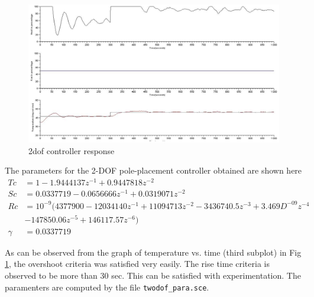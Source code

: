 \begin{figure}
\centering
\includegraphics[width=0.9\linewidth]{prbs/prbs-2dof-controller.png}
\caption{2dof controller response}
\label{2dof-controller}
\end{figure}

 The parameters for the 2-DOF pole-placement controller obtained are shown here
\begin{align*}
Tc &= 1 - 1.9444137 z^{ -1} + 0.9447818 z^{ -2}\\
Sc &= 0.0337719 - 0.0656666z^{ -1}+ 0.0319071z^ { -2}\\
Rc &= 10^{-9} (4377900 - 12034140 z^{ -1} + 11094713 z^ {-2} - 3436740.5 z^{-3} + 3.469D^{-09} z ^{-4} \\&- 147850.06 z^ {-5} + 146117.57 z^{ -6} )\\
\gamma &= 0.0337719
\end{align*}

As can be observed from the graph of temperature vs. time (third subplot) in Fig \ref{2dof-controller}, the overshoot criteria was satisfied very easily. The rise time criteria is observed to be more than 30 sec. This can be satisfied with experimentation.
The paramenters are computed by the file {\tt twodof\_para.sce}.  

